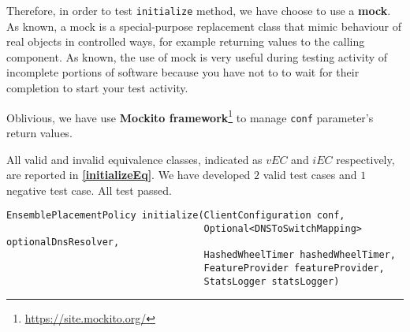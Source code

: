 \documentclass[sigconf]{acmart}
\begin{document}
Therefore, in order to test \texttt{initialize} method, we have choose to use a \textbf{mock}. As known, a mock is a special-purpose replacement class that mimic behaviour of real objects in controlled ways, for example returning values to the calling component. As known, the use of mock is very useful during testing activity of incomplete portions of software because you have not to to wait for their completion to start your test activity. 

Oblivious, we have use \textbf{Mockito framework}\footnote{\url{https://site.mockito.org/}} to manage \texttt{conf} parameter's return values.

All valid and invalid equivalence classes, indicated as $vEC$ and $iEC$ respectively, are reported in \textbf{\cref{initializeEq}}. We have developed $2$ valid test cases and $1$ negative test case. All test passed.

\begin{lstlisting}[frame=lines,basicstyle=\ttfamily\tiny, caption={Signature of method \texttt{initialize}}, label={initializeSignature}]
EnsemblePlacementPolicy initialize(ClientConfiguration conf,
                                   Optional<DNSToSwitchMapping> optionalDnsResolver,
                                   HashedWheelTimer hashedWheelTimer,
                                   FeatureProvider featureProvider,
                                   StatsLogger statsLogger)
\end{lstlisting}
\end{document}
